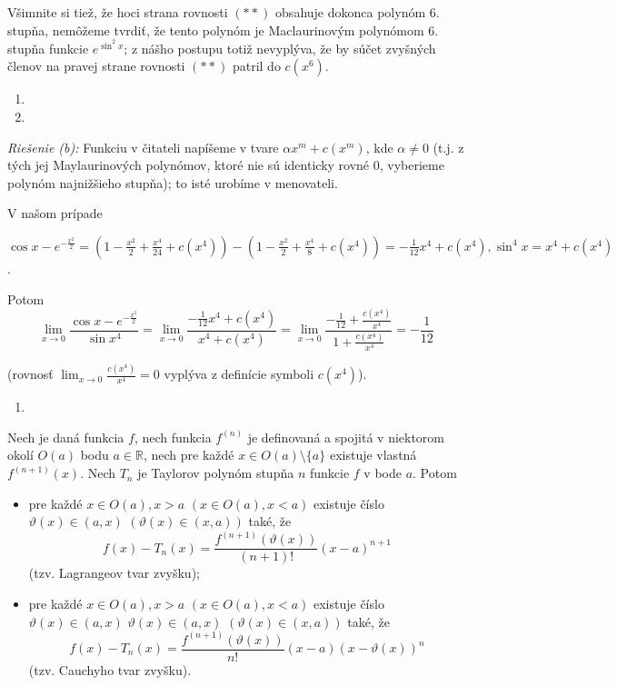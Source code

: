 Všimnite si tiež, že hoci strana rovnosti $(**)$ obsahuje dokonca polynóm $6.$ stupňa, nemôžeme tvrdiť, že tento polynóm je Maclaurinovým polynómom $6.$ stupňa funkcie $e^{\sin^2 x}$; z nášho postupu totiž nevyplýva, že by súčet zvyšných členov na pravej strane rovnosti $(**)$ patril do $c(x^6)$.

\begin{enumerate}[resume]
	\item {}
	\item {}
\end{enumerate}

\textit{Riešenie (b):}
Funkciu v čitateli napíšeme v tvare $\alpha x^m+c(x^m)$, kde $\alpha\neq 0$ (t.j. z tých jej Maylaurinových polynómov, ktoré nie sú identicky rovné $0$, vyberieme polynóm najnižšieho stupňa); to isté urobíme v menovateli.

V našom prípade

$\cos x -e^{-\frac{x^2}{2}}=(1-\frac{x^2}{2}+\frac{x^4}{24}+c(x^4))-(1-\frac{x^2}{2}+\frac{x^4}{8}+c(x^4))=-\frac{1}{12}x^4+c(x^4),\sin^4 x=x^4+c(x^4)$.

Potom 
$$\lim_{x\rightarrow 0}\frac{\cos x -e^{-\frac{x^2}{2}}}{\sin x^4}=\lim_{x\rightarrow 0}\frac{-\frac{1}{12}x^4+c(x^4)}{x^4+c(x^4)}=\lim_{x\rightarrow 0}\frac{{-\frac{1}{12}}+\frac{c(x^4)}{x^4}}{1+\frac{c(x^4)}{x^4}}=-\frac{1}{12}$$

(rovnosť $\lim_{x\rightarrow 0}\frac{c(x^4)}{x^4}=0$ vyplýva z definície symboli $c(x^4)$).

\begin{enumerate}[resume]
	\item {}
\end{enumerate}

\begin{veta}
Nech je daná funkcia $f$, nech funkcia $f^{(n)}$ je definovaná a spojitá v niektorom okolí $O(a)$ bodu $a\in\mathbb{R}$, nech pre každé $x\in O(a)\setminus \{a\}$ existuje vlastná $f^{(n+1)}(x)$. Nech $T_n$ je Taylorov polynóm stupňa $n$ funkcie $f$ v bode $a$. Potom
\begin{itemize}
\item pre každé $x\in O(a),x>a$ $(x\in O(a),x<a)$ existuje číslo $\vartheta (x)\in (a,x)$  $(\vartheta (x)\in (x,a))$ také, že
$$f(x)-T_n(x)=\frac{f^{(n+1)}(\vartheta (x))}{(n+1)!}(x-a)^{n+1}$$
(tzv. Lagrangeov tvar zvyšku);
\item pre každé $x\in O(a),x>a$  $(x\in O(a),x<a)$ existuje číslo $\vartheta (x)\in (a,x)$  $\vartheta (x)\in (a,x)$  $(\vartheta (x)\in (x,a))$ také, že 
$$f(x)-T_n(x)=\frac{f^{(n+1)}(\vartheta (x))}{n!}(x-a)(x-\vartheta (x))^n$$
(tzv. Cauchyho tvar zvyšku).
\end{itemize}
\end{veta}


